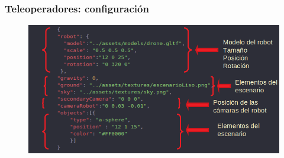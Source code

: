 \documentclass[xcolor={table}]{beamer}
\begin{document}
			\begin{frame}
			\frametitle{Teleoperadores: configuración}
		\begin{figure}{\textwidth}
    		\centering
             \includegraphics[scale=0.35]{img/configuracion.png}
             \label{fig:configuracion}
            \end{figure}
		\end{frame}
		
\end{document}
